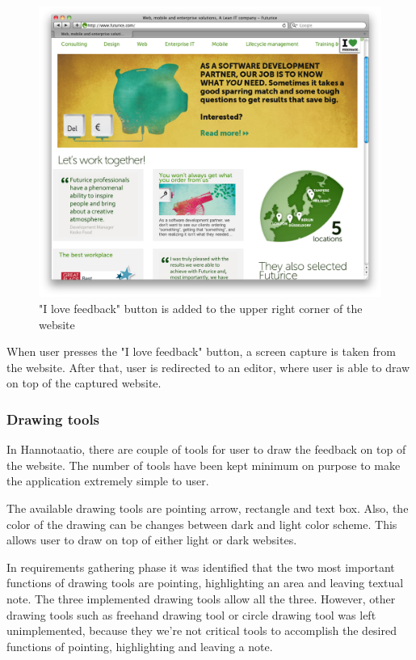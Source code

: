 \documentclass[english,12pt,a4paper,pdftex]{article}
\begin{document}
\begin{figure}[htb]
\begin{center}
\includegraphics[width=1.0\textwidth]{initiate_feedback.png}
\end{center}
\caption{"I love feedback" button is added to the upper right corner of the website}
\end{figure}

When user presses the "I love feedback" button, a screen capture is taken from the website. After that, user is redirected to an editor, where user is able to draw on top of the captured website.

\subsubsection{Drawing tools}

In Hannotaatio, there are couple of tools for user to draw the feedback on top of the website. The number of tools have been kept minimum on purpose to make the application extremely simple to user.

The available drawing tools are pointing arrow, rectangle and text box. Also, the color of the drawing can be changes between dark and light color scheme. This allows user to draw on top of either light or dark websites.

In requirements gathering phase it was identified that the two most important functions of drawing tools are pointing, highlighting an area and leaving textual note. The three implemented drawing tools allow all the three. However, other drawing tools such as freehand drawing tool or circle drawing tool was left unimplemented, because they we're not critical tools to accomplish the desired functions of pointing, highlighting and leaving a note.
\end{document}
